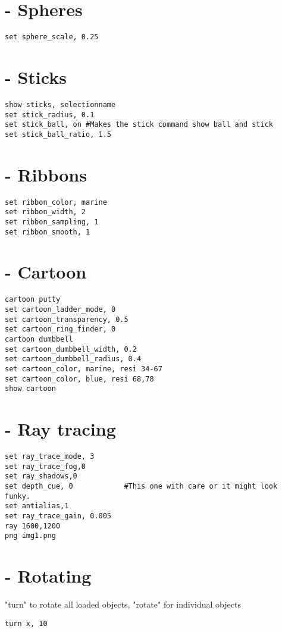 \documentclass[10pt, oneside, pdftex]{article}
\begin{document}
\section*{ - Spheres}
\begin{Verbatim}
set sphere_scale, 0.25
\end{Verbatim}

\section*{ - Sticks}
\begin{Verbatim}
show sticks, selectionname
set stick_radius, 0.1
set stick_ball, on #Makes the stick command show ball and stick
set stick_ball_ratio, 1.5
\end{Verbatim}

\section*{ - Ribbons}
\begin{Verbatim}
set ribbon_color, marine
set ribbon_width, 2
set ribbon_sampling, 1
set ribbon_smooth, 1
\end{Verbatim}

\section*{ - Cartoon}
\begin{Verbatim}
cartoon putty
set cartoon_ladder_mode, 0
set cartoon_transparency, 0.5
set cartoon_ring_finder, 0
cartoon dumbbell
set cartoon_dumbbell_width, 0.2
set cartoon_dumbbell_radius, 0.4
set cartoon_color, marine, resi 34-67
set cartoon_color, blue, resi 68,78
show cartoon
\end{Verbatim}

\section*{ - Ray tracing}
\begin{Verbatim}
set ray_trace_mode, 3
set ray_trace_fog,0
set ray_shadows,0
set depth_cue, 0            #This one with care or it might look funky.
set antialias,1
set ray_trace_gain, 0.005
ray 1600,1200
png img1.png
\end{Verbatim}

\section*{ - Rotating}
"turn" to rotate all loaded objects, "rotate" for individual objects
\begin{Verbatim}
turn x, 10
\end{Verbatim}
\end{document}
